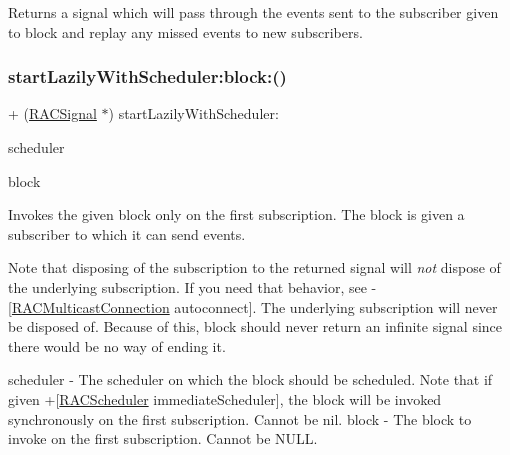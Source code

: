 Returns a signal which will pass through the events sent to the subscriber given to {\ttfamily block} and replay any missed events to new subscribers. \mbox{\label{interface_r_a_c_signal_adbef9afea68ea6a2a81bb3115f47c22c}} 
\subsubsection{\texorpdfstring{start\+Lazily\+With\+Scheduler\+:block\+:()}{startLazilyWithScheduler:block:()}\hspace{0.1cm}{\footnotesize\ttfamily [3/3]}}
{\footnotesize\ttfamily + (\mbox{\hyperlink{interface_r_a_c_signal}{R\+A\+C\+Signal}} $\ast$) start\+Lazily\+With\+Scheduler\+: \begin{DoxyParamCaption}\item[{(\mbox{\hyperlink{interface_r_a_c_scheduler}{R\+A\+C\+Scheduler}} $\ast$)}]{scheduler }\item[{block:(void($^\wedge$)(id$<$\mbox{\hyperlink{interface_r_a_c_subscriber}{R\+A\+C\+Subscriber}}$>$ subscriber))}]{block }\end{DoxyParamCaption}}

Invokes the given block only on the first subscription. The block is given a subscriber to which it can send events.

Note that disposing of the subscription to the returned signal will {\itshape not} dispose of the underlying subscription. If you need that behavior, see -\/\mbox{[}\mbox{\hyperlink{interface_r_a_c_multicast_connection}{R\+A\+C\+Multicast\+Connection}} autoconnect\mbox{]}. The underlying subscription will never be disposed of. Because of this, {\ttfamily block} should never return an infinite signal since there would be no way of ending it.

scheduler -\/ The scheduler on which the block should be scheduled. Note that if given +\mbox{[}\mbox{\hyperlink{interface_r_a_c_scheduler}{R\+A\+C\+Scheduler}} immediate\+Scheduler\mbox{]}, the block will be invoked synchronously on the first subscription. Cannot be nil. block -\/ The block to invoke on the first subscription. Cannot be N\+U\+LL.

